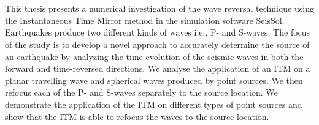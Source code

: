 \chapter{\abstractname}

This thesis presents a numerical investigation of the wave reversal technique using the Instantaneous 
Time Mirror method in the simulation software \href{https://seissol.org/}{SeisSol}. Earthquakes produce two different kinds of waves i.e., P- and S-waves. 
The focus of the study is to develop a novel approach to accurately determine the source of an earthquake by analyzing the time evolution 
of the seismic waves in both the forward and time-reversed directions. We analyse the application of an \acf{ITM} on a planar travelling wave and spherical waves
produced by point sources. We then refocus each of the P- and S-waves separately to the source location. We demonstrate the application
of the \ac{ITM} on different types of point sources and show that the \ac{ITM} is able to refocus the waves to the source location.